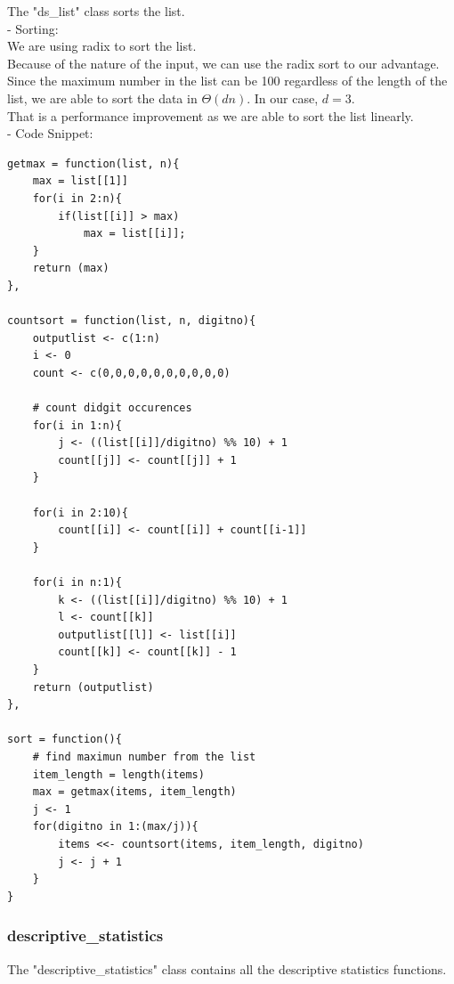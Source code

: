\documentclass[11pt]{article}
\begin{document}
The "ds\_list" class sorts the list.\\

- Sorting:\\

We are using \gls{radix} to sort the list.\\

Because of the nature of the input, we can use the radix sort to our advantage. Since the maximum number in the list can be 100 regardless of the length of the list, we are able to sort the data in $\Theta(dn)$\cite{CLRS}. In our case, $d=3$.\\

That is a performance improvement as we are able to sort the list linearly.\\

- Code Snippet:\\

\begin{lstlisting}
getmax = function(list, n){
    max = list[[1]]
    for(i in 2:n){
        if(list[[i]] > max)
            max = list[[i]];
    }
    return (max)
},

countsort = function(list, n, digitno){
    outputlist <- c(1:n)
    i <- 0
    count <- c(0,0,0,0,0,0,0,0,0,0)

    # count didgit occurences
    for(i in 1:n){
        j <- ((list[[i]]/digitno) %% 10) + 1 
        count[[j]] <- count[[j]] + 1 
    }
    
    for(i in 2:10){
        count[[i]] <- count[[i]] + count[[i-1]] 
    }
    
    for(i in n:1){
        k <- ((list[[i]]/digitno) %% 10) + 1
        l <- count[[k]]
        outputlist[[l]] <- list[[i]]
        count[[k]] <- count[[k]] - 1
    }
    return (outputlist)
},

sort = function(){
    # find maximun number from the list
    item_length = length(items)
    max = getmax(items, item_length)
    j <- 1
    for(digitno in 1:(max/j)){
        items <<- countsort(items, item_length, digitno)
        j <- j + 1
    }
}
\end{lstlisting}

\subsubsection{descriptive\_statistics}

The "descriptive\_statistics" class contains all the descriptive statistics functions.\\
\end{document}
